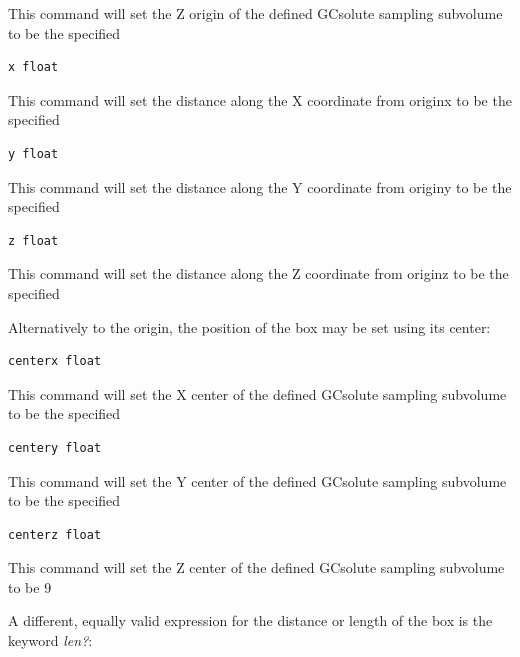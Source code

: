 \documentclass[letterpaper,10pt,english]{sphinxmanual}
\begin{document}
This command will set the Z origin of the defined GCsolute sampling subvolume to be the specified 

\begin{Verbatim}[commandchars=\\\{\}]
x float
\end{Verbatim}

This command will set the distance along the X coordinate from originx to be the specified 

\begin{Verbatim}[commandchars=\\\{\}]
y float
\end{Verbatim}

This command will set the distance along the Y coordinate from originy to be the specified 

\begin{Verbatim}[commandchars=\\\{\}]
z float
\end{Verbatim}

This command will set the distance along the Z coordinate from originz to be the specified 

Alternatively to the origin, the position of the box may be set using its center:

\begin{Verbatim}[commandchars=\\\{\}]
centerx float
\end{Verbatim}

This command will set the X center of the defined GCsolute sampling subvolume to be the specified 

\begin{Verbatim}[commandchars=\\\{\}]
centery float
\end{Verbatim}

This command will set the Y center of the defined GCsolute sampling subvolume to be the specified 

\begin{Verbatim}[commandchars=\\\{\}]
centerz float
\end{Verbatim}

This command will set the Z center of the defined GCsolute sampling subvolume to be 9

A different, equally valid expression for the distance or length of the box is the keyword \emph{len?}:
\end{document}
